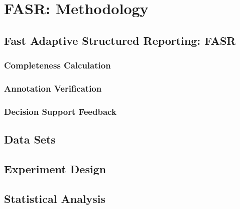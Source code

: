 \chapter{FASR: Methodology}

\section{Fast Adaptive Structured Reporting: FASR}

\subsection{Completeness Calculation}

\subsection{Annotation Verification}

\subsection{Decision Support Feedback}




\section{Data Sets}

\section{Experiment Design}

\section{Statistical Analysis}

